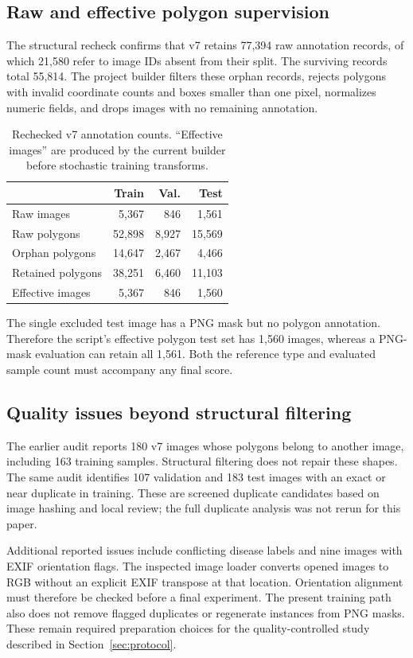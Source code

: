 \subsection{Raw and effective polygon supervision}
The structural recheck confirms that v7 retains 77,394 raw annotation records, of which 21,580 refer to image IDs absent from their split. The surviving records total 55,814. The project builder filters these orphan records, rejects polygons with invalid coordinate counts and boxes smaller than one pixel, normalizes numeric fields, and drops images with no remaining annotation.

\begin{table}[t]
\centering\small
\caption{Rechecked v7 annotation counts. ``Effective images'' are produced by the current builder before stochastic training transforms.}
\label{tab:effective}
\begin{tabular}{lrrr}\toprule
 & Train & Val. & Test\\\midrule
Raw images & 5,367 & 846 & 1,561\\
Raw polygons & 52,898 & 8,927 & 15,569\\
Orphan polygons & 14,647 & 2,467 & 4,466\\
Retained polygons & 38,251 & 6,460 & 11,103\\
Effective images & 5,367 & 846 & 1,560\\\bottomrule
\end{tabular}
\end{table}

The single excluded test image has a PNG mask but no polygon annotation. Therefore the script's effective polygon test set has 1,560 images, whereas a PNG-mask evaluation can retain all 1,561. Both the reference type and evaluated sample count must accompany any final score.

\subsection{Quality issues beyond structural filtering}
The earlier audit reports 180 v7 images whose polygons belong to another image, including 163 training samples. Structural filtering does not repair these shapes. The same audit identifies 107 validation and 183 test images with an exact or near duplicate in training. These are screened duplicate candidates based on image hashing and local review; the full duplicate analysis was not rerun for this paper.

Additional reported issues include conflicting disease labels and nine images with EXIF orientation flags. The inspected image loader converts opened images to RGB without an explicit EXIF transpose at that location. Orientation alignment must therefore be checked before a final experiment. The present training path also does not remove flagged duplicates or regenerate instances from PNG masks. These remain required preparation choices for the quality-controlled study described in Section~\ref{sec:protocol}.

